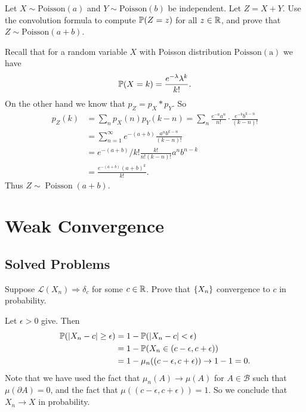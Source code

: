 \begin{problem}
	Let $ X\sim \text{Poisson}(a) $ and $ Y\sim\text{Poisson}(b) $ be independent. Let $ Z = X+Y $. Use the convolution formula to compute $ \mathbb{P}(Z=z) $ for all $ z\in\mathbb{R} $, and prove that $ Z\sim \text{Poisson}(a+b) $.
\end{problem}
\begin{solution}
	Recall that for a random variable $ X $ with Poisson distribution $ \operatorname{Poisson(a)} $ we have
	\[ \mathbb{P}(X = k) = \frac{e^{-\lambda}\lambda^k}{k!}. \]
	On the other hand we know that $ p_Z = p_X \ast p_Y  $. So 
	\begin{align*}
		p_Z(k) &= \sum_{n} p_X(n)p_Y(k-n) = \sum_n \frac{e^{-a}a^n}{n!}\cdot\frac{e^{-b}b^{k-n}}{(k-n)!}\\
		&=\sum_{n=1}^{\infty} e^{-(a+b)}\frac{a^nb^{k-n}}{(k-n)!} \\
		&=  e^{-(a+b)}/k! \frac{k!}{n!(k-n)!}a^n b^{n-k} \\
		&= \frac{e^{-(a+b)}(a+b)^k}{k!}.
	\end{align*}
	Thus $ Z \sim \operatorname{Poisson}(a+b) $.
\end{solution}


\section{Weak Convergence}


\subsection{Solved Problems}

\begin{problem}
	Suppose $ \mathcal{L}(X_n)\Rightarrow \delta_c $ for some $ c\in \mathbb{R} $. Prove that $ \{X_n\} $ convergence to $ c $ in probability.
\end{problem}
\begin{solution}
	Let $ \epsilon>0 $ give. Then
	\begin{align*}
		\mathbb{P}(|X_n - c| \geq \epsilon) &= 1 - \mathbb{P}(|X_n - c|<\epsilon) \\
		&= 1-\mathbb{P}(X_n \in (c-\epsilon,c+\epsilon))\\
		&= 1 - \mu_n ((c-\epsilon,c+\epsilon)) \to 1 - 1 = 0.
	\end{align*}
	Note that we have used the fact that $ \mu_n(A)\to \mu(A) $ for $ A\in \mathcal{B} $ such that $ \mu(\partial A) = 0 $, and the fact that $ \mu((c-\epsilon,c+\epsilon)) = 1 $. So we conclude that $ X_n\to X $ in probability.
\end{solution}

